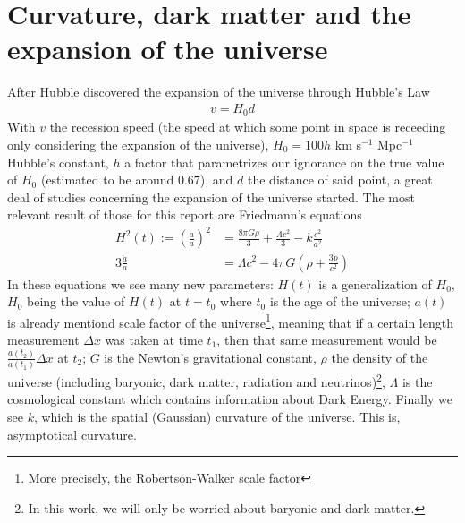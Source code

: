 \section{Curvature, dark matter and the expansion of the universe}
After Hubble discovered the expansion of the universe through Hubble's Law\cite{Hubble1929}
\begin{align}
	v = H_0 d
	\label{eq:ley-hubble}
\end{align}
With $v$ the recession speed (the speed at which some point in space is receeding only considering the expansion of the universe), $H_0=100h$ km s$^{-1}$ Mpc$^{-1}$ Hubble's constant, $h$ a factor that parametrizes our ignorance on the true value of $H_0$ (estimated to be around $0.67$), and $d$ the distance of said point, a great deal of studies concerning the expansion of the universe started. The most relevant result of those for this report are Friedmann's equations \\
\begin{align}
	H^2(t) := \left(\frac{\dot a}{a}\right)^2 &=  \frac{8\pi G \rho}{3} +\frac{\Lambda c^2}{3} - k \frac{c^2}{a^2}
	\label{eq:1a-friedmann}\\
	3 \frac{\ddot a}{a} &= \Lambda c^2 - 4\pi G \left( \rho + \frac{3p}{c^2} \right) 
	\label{eq:2a-friedmann}
\end{align}
In these equations we see many new parameters: $H(t)$ is a generalization of $H_0$, $H_0$ being the value of $H(t)$ at $t=t_0$ where $t_0$ is the age of the universe; $a(t)$ is already mentiond scale factor of the universe\footnote{More precisely, the Robertson-Walker scale factor\cite{cosmology}}, meaning that if a certain length measurement $\Delta x$ was taken at time $t_1$, then that same measurement would be $\frac{a(t_2)}{a(t_1)}\Delta x$ at $t_2$; $G$ is the Newton's gravitational constant, $\rho$ the density of the universe (including baryonic, dark matter, radiation and neutrinos)\footnote{In this work, we will only be worried about baryonic and dark matter.}, $\Lambda$ is the cosmological constant which contains information about Dark Energy. Finally we see $k$, which is the spatial (Gaussian) curvature of the universe. This is, asymptotical curvature. \\

